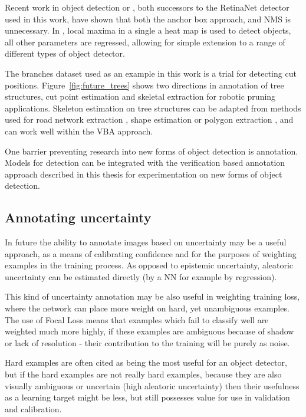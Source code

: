 Recent work in object detection \cite{Zhou2019} or \cite{Law2018}, both successors to the RetinaNet detector \cite{Wang2017} used in this work, have shown that both the anchor box approach, and \gls{NMS} is unnecessary. In \cite{Zhou2019}, local maxima in a single a heat map is used to detect objects, all other parameters are regressed, allowing for simple extension to a range of different types of object detector.

The branches dataset used as an example in this work is a trial for detecting cut positions. Figure~\ref{fig:future_trees} shows two directions in annotation of tree structures, cut point estimation and skeletal extraction for robotic pruning applications. Skeleton estimation on tree structures can be adapted from methods used for road network extraction \cite{Li2018}, shape estimation \cite{Jiang2019a} or polygon extraction \cite{Acuna2018}, and can work well within the \gls{VBA} approach.

One barrier preventing research into new forms of object detection is annotation. Models for detection can be integrated with the verification based annotation approach described in this thesis for experimentation on new forms of object detection.

\subsection{Annotating uncertainty}

In future the ability to annotate images based on uncertainty may be a useful approach, as a means of calibrating confidence and for the purposes of weighting examples in the training process. As opposed to epistemic uncertainty, aleatoric uncertainty can be estimated directly (by a \gls{NN} for example by regression).  

This kind of uncertainty annotation may be also useful in weighting training loss, where the network can place more weight on hard, yet unambiguous examples. The use of Focal Loss means that examples which fail to classify well are weighted much more highly, if these examples are ambiguous because of shadow or lack of resolution - their contribution to the training will be purely as noise.

Hard examples are often cited as being the most useful for an object detector, but if the hard examples are not really hard examples, because they are also visually ambiguous or uncertain (high aleatoric uncertainty) then their usefulness as a learning target might be less, but still possesses value for use in validation and calibration.



